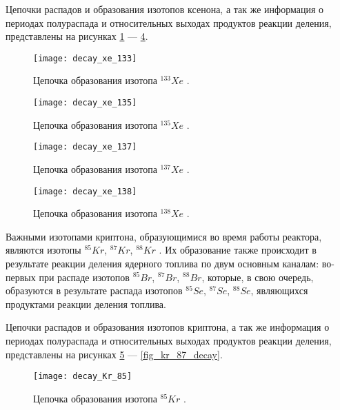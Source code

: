 Цепочки распадов и образования изотопов ксенона, а так же информация о периодах полураспада и относительных выходах 
продуктов реакции деления, представлены на рисунках \ref{fig_xe_133_decay} --- \ref{fig_xe_138_decay}.

\begin{figure}[ht!]
    \centering
    \texttt{[image: decay\_xe\_133]}
    \captionsetup{justification=centering}
    \caption{Цепочка образования изотопа $^{133}Xe$ \cite{periodic_table}.}
    \label{fig_xe_133_decay}
\end{figure}

\begin{figure}[ht!]
    \centering
    \texttt{[image: decay\_xe\_135]}
    \captionsetup{justification=centering}
    \caption{Цепочка образования изотопа $^{135}Xe$ \cite{periodic_table}.}
    \label{fig_xe_135_decay}
\end{figure}

\begin{figure}[ht!]
    \centering
    \texttt{[image: decay\_xe\_137]}
    \captionsetup{justification=centering}
    \caption{Цепочка образования изотопа $^{137}Xe$ \cite{periodic_table}.}
    \label{fig_xe_137_decay}
\end{figure}

\begin{figure}[ht!]
    \centering
    \texttt{[image: decay\_xe\_138]}
    \captionsetup{justification=centering}
    \caption{Цепочка образования изотопа $^{138}Xe$ \cite{periodic_table}.}
    \label{fig_xe_138_decay}
\end{figure}

Важными изотопами криптона, образующимися во время работы реактора, являются изотопы $^{85}Kr$, $^{87}Kr$, $^{88}Kr$ 
\cite{gusev_bio}. Их образование также происходит в результате реакции деления ядерного топлива по двум основным каналам: 
во-первых при распаде изотопов $^{85}Br$, $^{87}Br$, $^{88}Br$, которые, в свою очередь, образуются в результате распада 
изотопов $^{85}Se$, $^{87}Se$, $^{88}Se$, являющихся продуктами реакции деления топлива.

Цепочки распадов и образования изотопов криптона, а так же информация о периодах полураспада и относительных выходах 
продуктов реакции деления, представлены на рисунках \ref{fig_kr_85_decay} --- \ref{fig_kr_87_decay}. 

\begin{figure}[ht!]
    \centering
    \texttt{[image: decay\_Kr\_85]}
    \captionsetup{justification=centering}
    \caption{Цепочка образования изотопа $^{85}Kr$ \cite{periodic_table}.}
    \label{fig_kr_85_decay}
\end{figure}

